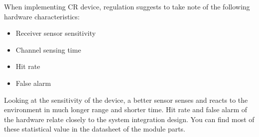 When implementing CR device, regulation suggests to take note of the following hardware characteristics:
\begin{itemize}
  \item Receiver sensor sensitivity 
  \item Channel sensing time
  \item Hit rate
  \item False alarm
\end{itemize}
Looking at the sensitivity of the device, a better sensor senses and reacts to the environment in much longer range and shorter 
time. Hit rate and false alarm of the hardware relate closely to the system integration design. You can find most of these statistical
value in the datasheet of the module parts.

